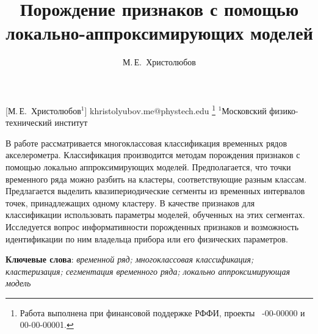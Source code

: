 \documentclass[12pt, twoside]{article}
\begin{document}
\title
    [Порождение признаков с помощью локально-аппроксимирующих моделей] %
    {Порождение признаков с помощью локально-аппроксимирующих моделей}
\author
    [М.\,Е.~Христолюбов] %
    {М.\,Е.~Христолюбов} %
    [М.\,Е.~Христолюбов$^1$] %
\email
    {khristolyubov.me@phystech.edu}
\thanks
    {Работа выполнена при
     финансовой поддержке РФФИ, проекты \No\ -00-00000 и 00-00-00001.}
\organization
    {$^1$Московский физико-технический институт}
\abstract
    {В работе рассматривается многоклассовая классификация временных рядов акселерометра. Классификация производится методам порождения признаков с помощью локально аппроксимирующих моделей. Предполагается, что точки временного ряда можно разбить на кластеры, соответствующие разным классам. Предлагается выделить квазипериодические сегменты из временных интервалов точек, принадлежащих одному кластеру. В качестве признаков для классификации использовать параметры моделей, обученных на этих сегментах. Исследуется вопрос информативности порожденных признаков и возможность идентификации по ним владельца прибора или его физических параметров.
	
\bigskip
\noindent
\textbf{Ключевые слова}: \emph {временной ряд; многоклассовая классификация; кластеризация; сегментация временного ряда; локально аппроксимирующая модель}
}
\end{document}
